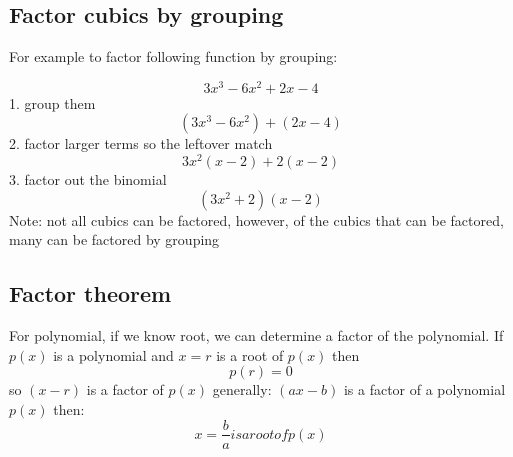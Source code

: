 \documentclass{article}
\begin{document}
\subsection{Factor cubics by grouping}
For example to factor following function by grouping:

\begin{equation}
  3x^3-6x^2+2x-4
\end{equation}
1. group them
\begin{equation}
  (3x^3-6x^2)+(2x-4)
\end{equation}
2. factor larger terms so the leftover match
\begin{equation}
  3x^2(x-2)+2(x-2)
\end{equation}
3. factor out the binomial
\begin{equation}
  (3x^2+2)(x-2)
\end{equation}
Note: not all cubics can be factored, however,
of the cubics that can be factored,
many can be factored by grouping

\subsection{Factor theorem}
For polynomial, if we know root, we can determine a factor of the
polynomial. If $p(x)$ is a polynomial and $x=r$ is a root of $p(x)$ then
\begin{equation}
  p(r) = 0
\end{equation}
so $(x-r)$ is a factor of $p(x)$
generally: $(ax-b)$ is a factor of a polynomial $p(x)$ then:
\begin{equation}
  x = \frac{b}{a} is a root of p(x)
\end{equation}
\end{document}
